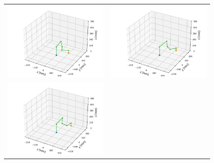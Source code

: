 \documentclass{ltjsarticle}
\begin{document}
\begin{figure}[H]
\begin{tabular}{cc}
\begin{minipage}[c]{0.48\linewidth}
			\includegraphics[width = 0.96\linewidth]{../results/program3_3.png}
			\subcaption{}
		\end{minipage}
		&
		\begin{minipage}[c]{0.48\linewidth}
			\centering
			\includegraphics[width = 0.96\linewidth]{../results/program3_4.png}
			\subcaption{}
		\end{minipage}
		\\
		\begin{minipage}[c]{0.48\linewidth}
			\centering
			\includegraphics[width = 0.96\linewidth]{../results/program3_5.png}

\end{minipage}
\end{tabular}
\end{figure}
\end{document}
